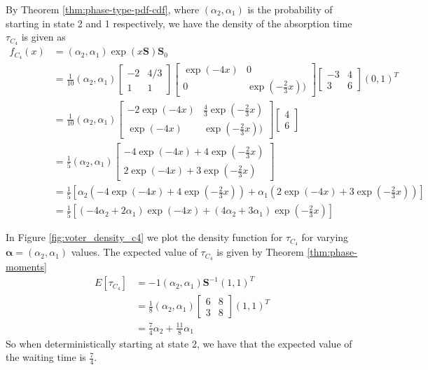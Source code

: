 By Theorem \ref{thm:phase-type-pdf-cdf}, where $(\alpha_2, \alpha_1)$ is the probability of starting in state 2 and 1 respectively, we have the density of the absorption time $\tau_{C_4}$ is given as
\begin{align*}
    f_{C_4}(x) &= (\alpha_2, \alpha_1) \exp(x\mathbf{S}) \mathbf{S}_0\\
    &= \frac{1}{10} (\alpha_2, \alpha_1) \begin{bmatrix}
    -2 & 4/3\\
    1 & 1
\end{bmatrix}
\begin{bmatrix}
\exp(-4x) & 0\\
0 & \exp(- \frac{2}{3} x))
\end{bmatrix}
\begin{bmatrix}
    -3 & 4\\
    3 & 6
\end{bmatrix}
(0,1)^T\\
&= \frac{1}{10} (\alpha_2, \alpha_1)
\begin{bmatrix}
-2 \exp(-4x) & \frac{4}{3} \exp(-\frac{2}{3} x)\\
\exp(-4x) & \exp(- \frac{2}{3} x))
\end{bmatrix}
\begin{bmatrix}
    4\\
    6
\end{bmatrix}\\
&= \frac{1}{5} (\alpha_2, \alpha_1)
\begin{bmatrix}
-4 \exp(-4x) + 4 \exp(-\frac{2}{3} x)\\
2 \exp(-4x) + 3 \exp(-\frac{2}{3} x)
\end{bmatrix}\\
&= \frac{1}{5} \left[ \alpha_2 \left( -4 \exp(-4x) + 4 \exp\left(-\frac{2}{3} x\right) \right) + \alpha_1 \left( 2 \exp(-4x) + 3 \exp\left(-\frac{2}{3} x\right) \right) \right]\\
&= \frac{1}{5} \left[ (-4 \alpha_2 + 2 \alpha_1) \exp(-4x) + (4 \alpha_2 + 3 \alpha_1) \exp\left(-\frac{2}{3} x\right)\right]
\end{align*}

In Figure \ref{fig:voter_density_c4} we plot the density function for $\tau_{C_4}$ for varying $\boldsymbol{\alpha} = (\alpha_2, \alpha_1)$ values.
The expected value of $\tau_{C_4}$ is given by Theorem \ref{thm:phase-moments}
\begin{align*}
    E[\tau_{C_4}] &= -1 (\alpha_2, \alpha_1) \mathbf{S}^{-1} (1, 1)^T\\
    &= \frac{1}{8} (\alpha_2, \alpha_1) \begin{bmatrix}
    6 & 8\\
    3 & 8
    \end{bmatrix} (1,1)^T\\
    &= \frac{7}{4} \alpha_2 + \frac{11}{8} \alpha_1
\end{align*}
So when deterministically starting at state 2, we have that the expected value of the waiting time is $\frac{7}{4}$.

